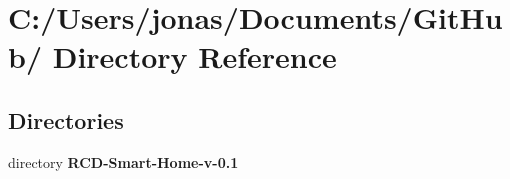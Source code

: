 \section{C:/Users/jonas/Documents/Git\-Hub/ Directory Reference}
\label{dir_C_3A_2FUsers_2Fjonas_2FDocuments_2FGitHub_2F}


\subsection*{Directories}
\begin{CompactItemize}
\item 
directory {\bf RCD-Smart-Home-v-0.1}
\end{CompactItemize}
